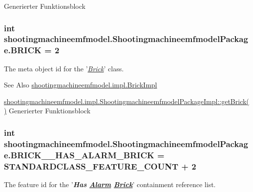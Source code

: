 Generierter Funktionsblock  \hypertarget{interfaceshootingmachineemfmodel_1_1_shootingmachineemfmodel_package_a6355a6c7462f68952499f472884795ab}{
\subsubsection[{B\-R\-I\-C\-K}]{\setlength{\rightskip}{0pt plus 5cm}int shootingmachineemfmodel.\-Shootingmachineemfmodel\-Package.\-B\-R\-I\-C\-K = 2}}\label{interfaceshootingmachineemfmodel_1_1_shootingmachineemfmodel_package_a6355a6c7462f68952499f472884795ab}
The meta object id for the '\hyperlink{classshootingmachineemfmodel_1_1impl_1_1_brick_impl}{{\itshape Brick}}' class.

\begin{DoxySeeAlso}{See Also}
\hyperlink{classshootingmachineemfmodel_1_1impl_1_1_brick_impl}{shootingmachineemfmodel.\-impl.\-Brick\-Impl} 

\hyperlink{classshootingmachineemfmodel_1_1impl_1_1_shootingmachineemfmodel_package_impl_aaef94e2843dca6a355980df230d01339}{shootingmachineemfmodel.\-impl.\-Shootingmachineemfmodel\-Package\-Impl\-::get\-Brick()} Generierter Funktionsblock 
\end{DoxySeeAlso}
\hypertarget{interfaceshootingmachineemfmodel_1_1_shootingmachineemfmodel_package_a13634cc753a61b2654bba945425c6a2a}{
\subsubsection[{B\-R\-I\-C\-K\-\_\-\-\_\-\-H\-A\-S\-\_\-\-A\-L\-A\-R\-M\-\_\-\-B\-R\-I\-C\-K}]{\setlength{\rightskip}{0pt plus 5cm}int shootingmachineemfmodel.\-Shootingmachineemfmodel\-Package.\-B\-R\-I\-C\-K\-\_\-\-\_\-\-H\-A\-S\-\_\-\-A\-L\-A\-R\-M\-\_\-\-B\-R\-I\-C\-K = {\bf S\-T\-A\-N\-D\-A\-R\-D\-C\-L\-A\-S\-S\-\_\-\-F\-E\-A\-T\-U\-R\-E\-\_\-\-C\-O\-U\-N\-T} + 2}}\label{interfaceshootingmachineemfmodel_1_1_shootingmachineemfmodel_package_a13634cc753a61b2654bba945425c6a2a}
The feature id for the '{\itshape {\bfseries Has \hyperlink{interfaceshootingmachineemfmodel_1_1_alarm}{Alarm} \hyperlink{interfaceshootingmachineemfmodel_1_1_brick}{Brick}}}' containment reference list.


